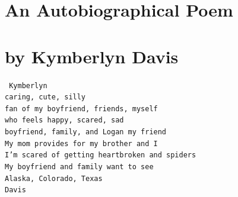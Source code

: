 \documentclass[10pt]{report}
\newcommand{\fbd}{
    \setlength{\fboxsep}{0pt}
    \setlength{\fboxrule}{3pt}
  }
\begin{document}
\clearpage





\chapter*{%
  \huge An Autobiographical Poem\\
  \small \;\\by Kymberlyn Davis
}

\begin{center}
  \texttt{
    Kymberlyn\\
    caring, cute, silly\\
    fan of my boyfriend, friends, myself\\
    who feels happy, scared, sad\\
    boyfriend, family, and Logan my friend\\
    My mom provides for my brother and I\\
    I'm scared of getting heartbroken and spiders\\
    My boyfriend and family want to see\\
    Alaska, Colorado, Texas\\
     Davis
    }
    \;\\
    \;\\
    \;\\{%
      \fbd
    }
\end{center}
\clearpage
\end{document}
